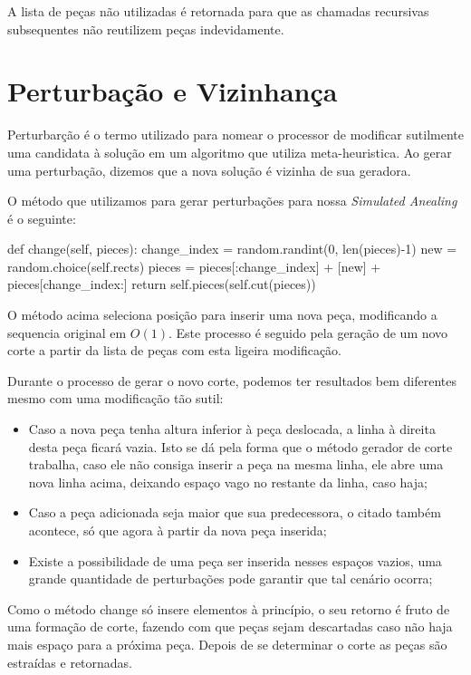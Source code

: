 \documentclass[12pt]{article}
\begin{document}
A lista de peças não utilizadas é retornada para que as chamadas recursivas subsequentes não reutilizem peças indevidamente.

\section*{Perturbação e Vizinhança}

Perturbarção é o termo utilizado para nomear o processor de modificar
sutilmente uma candidata à solução em um algoritmo que utiliza meta-heuristica.
Ao gerar uma perturbação, dizemos que a nova solução é vizinha de sua geradora.

O método que utilizamos para gerar perturbações para nossa \textit{Simulated Anealing} é o seguinte:

\begin{python}
    def change(self, pieces):
        change_index = random.randint(0, len(pieces)-1)
        new = random.choice(self.rects)
        pieces = pieces[:change_index] + [new] + pieces[change_index:]
        return self.pieces(self.cut(pieces))
\end{python}

O método acima seleciona posição para inserir uma nova peça, modificando a sequencia original em $O(1)$. Este processo é seguido pela geração de um novo corte a partir da lista de peças com esta ligeira modificação.

Durante o processo de gerar o novo corte, podemos ter resultados bem diferentes mesmo com uma modificação tão sutil:

\begin{itemize}
    \item Caso a nova peça tenha altura inferior à peça deslocada, a linha à direita desta peça ficará vazia. Isto se dá pela forma que o método gerador de corte trabalha, caso ele não consiga inserir a peça na mesma linha, ele abre uma nova linha acima, deixando espaço vago no restante da linha, caso haja;
    \item Caso a peça adicionada seja maior que sua predecessora, o citado também acontece, só que agora à partir da nova peça inserida;
    \item Existe a possibilidade de uma peça ser inserida nesses espaços vazios, uma grande quantidade de perturbações pode garantir que tal cenário ocorra;
\end{itemize}

    Como o método change só insere elementos à princípio, o seu retorno é fruto de uma formação de corte, fazendo com que peças sejam descartadas caso não haja mais espaço para a próxima peça. Depois de se determinar o corte as peças são estraídas e retornadas.
\end{document}
